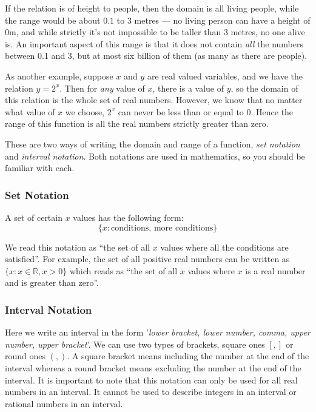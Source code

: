 \documentclass[10pt,a4paper,titlepage,twoside,openright]{report}
\begin{document}
If the relation is of height to people, then the domain is all living people, while the range would be about $0.1$ to $3$ metres --- no living person can have a height of 0m, and while strictly it's not impossible to be taller than 3 metres, no one alive is. An important aspect of this range is that it does not contain \textit{all} the numbers between 0.1 and 3, but at most six billion of them (as many as there are people).

As another example, suppose $x$ and $y$ are real valued variables, and we have the relation $y = 2^x$. Then for \textit{any} value of $x$, there is a value of $y$, so the domain of this relation is the whole set of real numbers. However, we know that no matter what value of $x$ we choose, $2^x$ can never be less than or equal to 0. Hence the range of this function is all the real numbers strictly greater than zero.

These are two ways of writing the domain and range of a function, \textit{set notation} and \textit{interval notation}. Both notations are used in mathematics, so you should be familiar with each.

\subsubsection{Set Notation}
A set of certain $x$ values has the following form:
\begin{equation}
\label{eq:mf:g:set}
\{x:\textrm{conditions, more conditions}\}
\end{equation}

We read this notation as ``the set of all $x$ values where all the conditions are satisfied''. For example, the set of all positive real numbers can be written as $\{x:x\in\mathbb{R}, x>0\}$ which reads as ``the set of all $x$ values where $x$ is a real number and is greater than zero''.

\subsubsection{Interval Notation}
Here we write an interval in the form '\textit{lower bracket, lower number, comma, upper number, upper bracket}'. We can use two types of brackets, square ones $[ , ]$ or round ones $( , )$. A square bracket means including the number at the end of the interval whereas a round bracket means excluding the number at the end of the interval. It is important to note that this notation can only be used for all real numbers in an interval. It cannot be used to describe integers in an interval or rational numbers in an interval.
\end{document}
